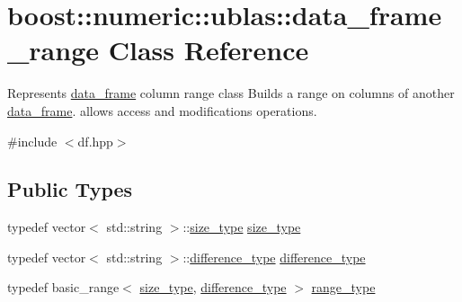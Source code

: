 \hypertarget{classboost_1_1numeric_1_1ublas_1_1data__frame__range}{}\section{boost\+:\+:numeric\+:\+:ublas\+:\+:data\+\_\+frame\+\_\+range Class Reference}
\label{classboost_1_1numeric_1_1ublas_1_1data__frame__range}


Represents \hyperlink{classboost_1_1numeric_1_1ublas_1_1data__frame}{data\+\_\+frame} column range class Builds a range on columns of another \hyperlink{classboost_1_1numeric_1_1ublas_1_1data__frame}{data\+\_\+frame}. allows access and modifications operations.  




{\ttfamily \#include $<$df.\+hpp$>$}

\subsection*{Public Types}
\begin{DoxyCompactItemize}
\item 
typedef vector$<$ std\+::string $>$\+::\hyperlink{classboost_1_1numeric_1_1ublas_1_1data__frame__range_a14a4584e296fdfc9d8c2accd6e27ba01}{size\+\_\+type} \hyperlink{classboost_1_1numeric_1_1ublas_1_1data__frame__range_a14a4584e296fdfc9d8c2accd6e27ba01}{size\+\_\+type}
\item 
typedef vector$<$ std\+::string $>$\+::\hyperlink{classboost_1_1numeric_1_1ublas_1_1data__frame__range_acb334affe8ebaa8fb9e59296c77072a3}{difference\+\_\+type} \hyperlink{classboost_1_1numeric_1_1ublas_1_1data__frame__range_acb334affe8ebaa8fb9e59296c77072a3}{difference\+\_\+type}
\item 
typedef basic\+\_\+range$<$ \hyperlink{classboost_1_1numeric_1_1ublas_1_1data__frame__range_a14a4584e296fdfc9d8c2accd6e27ba01}{size\+\_\+type}, \hyperlink{classboost_1_1numeric_1_1ublas_1_1data__frame__range_acb334affe8ebaa8fb9e59296c77072a3}{difference\+\_\+type} $>$ \hyperlink{classboost_1_1numeric_1_1ublas_1_1data__frame__range_ac63cd34d67e118765217538d59076bf3}{range\+\_\+type}
\end{DoxyCompactItemize}
